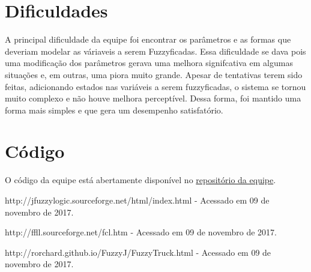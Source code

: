 \documentclass [12pt, a4paper] {article}
\begin{document}
\newpage
\section{Dificuldades}
A principal dificuldade da equipe foi encontrar os parâmetros e as formas que deveriam modelar as váriaveis a serem Fuzzyficadas. Essa dificuldade se dava pois uma modificação dos parâmetros gerava uma melhora signifcativa em algumas situações e, em outras, uma piora muito grande. Apesar de tentativas terem sido feitas, adicionando estados nas variáveis a serem fuzzyficadas, o sistema se tornou muito complexo e não houve melhora perceptível. Dessa forma, foi mantido uma forma mais simples e que gera um desempenho satisfatório.


\newpage
\section{Código}
O código da equipe está abertamente disponível no
\href{https://github.com/andrei258258/ine5430-fuzzy}{repositório da equipe}.



\newpage
\begin{thebibliography}{9}

http://jfuzzylogic.sourceforge.net/html/index.html - Acessado em 09 de novembro de 2017.

http://ffll.sourceforge.net/fcl.htm - Acessado em 09 de novembro de 2017.

http://rorchard.github.io/FuzzyJ/FuzzyTruck.html - Acessado em 09 de novembro de 2017.

\end{thebibliography}
\end{document}

